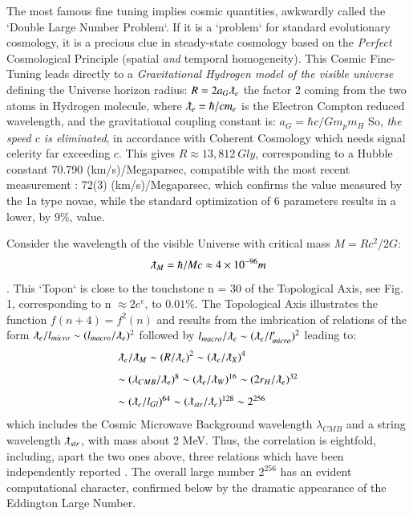 \documentclass[twoside,draft]{article}
\begin{document}
\begin{sloppypar}
{The most famous fine tuning implies cosmic quantities, awkwardly called the `Double
Large Number Problem`. If it is a `problem` for standard evolutionary cosmology, it is a precious
clue in steady-state cosmology based on the \textit{Perfect} Cosmological Principle (spatial \textit{and} temporal homogeneity).
This Cosmic Fine-Tuning leads directly to a \textit{Gravitational Hydrogen model of the visible universe} \cite{Sanchez1}
defining the Universe horizon radius: $R = 2a_{G} \lambdabar_{e}$ the factor 2 coming from the two atoms in
Hydrogen molecule, where 
$\lambdabar_{e} = \hbar/cm_{e}$
is the Electron Compton reduced wavelength, and the
gravitational coupling constant is: 
$a_{G} = \hbar c/Gm_{p}m_{H}$
So, \textit{the speed $c$ is eliminated}, in accordance with
Coherent Cosmology which needs signal celerity far exceeding $c$. This gives $R \approx 13,812~Gly $, corresponding to a Hubble constant 70.790 (km/s)/Megaparsec, compatible with the
most recent measurement \cite{Bonvin}: 72(3) (km/s)/Megaparsec, which confirms the value measured by the 1a type novae, while the standard optimization of 6 parameters results in a lower, by $9\%$, value.

Consider the wavelength of the visible Universe with critical mass $M= Rc^2/2G$: $$\lambdabar_{M} = \hbar /Mc \approx 4 \times 10^{-96} m$$ . This `Topon` is close to the touchstone n = 30 of the Topological Axis, see Fig. 1,
corresponding to n $\approx 2e^{e}$, to $0.01\%$. The Topological Axis illustrates the function $f(n + 4) = f^{2}(n)$
and results from the imbrication of relations of the form 
$
\lambdabar_{e} /l_{micro} \sim (l_{macro} /\lambdabar_{e})^{2}
$
followed by 
$
l_{macro} /\lambdabar_{e} \sim (\lambdabar_{e} /l^{\prime}_{micro} )^{2}
$ leading to:
$$
\begin{array}{ll}
%
\displaystyle
\lambdabar_{e}/\lambdabar_{M} \sim (R/\lambdabar_{e})^{2} \sim (\lambdabar_{e}/ \lambdabar_{X})^{4}\\[+8pt]  %
\sim (\lambda_{CMB}/ \lambdabar_{e})^{8} \sim (\lambdabar_{e}/\lambdabar_{W})^{16} \sim (2r_{H} /\lambdabar_{e})^{32}\\[+8pt] %
\sim (\lambdabar_{e}/ l_{Gl} )^{64} \sim (\lambdabar_{str} /\lambdabar_{e} )^{128} \sim 2^{256}\\ %
\end{array}
$$
which includes the Cosmic Microwave Background wavelength $\lambda_{CMB}$ and a string wavelength $\lambdabar_{str}$, with mass about 2 MeV. Thus, the correlation is eightfold,
including, apart the two ones above, three relations which have been independently reported \cite{Sanchez1}.
The overall large number $2^{256}$ has an evident computational character, confirmed below by the
dramatic appearance of the Eddington Large Number.

}
\end{sloppypar}
\end{document}
